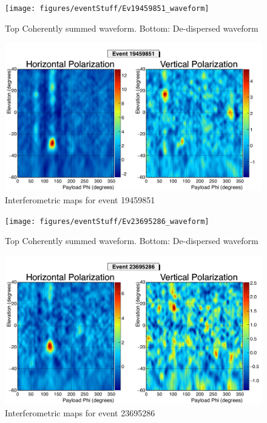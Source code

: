 		\begin{figure}
		\centering
			\texttt{[image: figures/eventStuff/Ev19459851\_waveform]}
			\caption{Top Coherently summed waveform.  Bottom: De-dispersed waveform} 
		\label{fig:Ev19459851_waveform}
		\end{figure}
		
		\begin{figure}
		\centering
			\includegraphics[width=\textwidth]{figures/intMap/intMap_ev19459851}
			\caption{Interferometric maps for event 19459851} 
		\label{fig:Ev19459851_map}
		\end{figure}	
	
		\begin{figure}
		\centering
			\texttt{[image: figures/eventStuff/Ev23695286\_waveform]}
			\caption{Top Coherently summed waveform.  Bottom: De-dispersed waveform} 
		\label{fig:Ev23695286_waveform}
		\end{figure}
		
		\begin{figure}
		\centering
			\includegraphics[width=\textwidth]{figures/intMap/intMap_ev23695286}
			\caption{Interferometric maps for event 23695286} 
		\label{fig:Ev23695286_map}
		\end{figure}			
	
